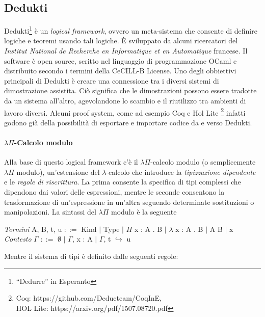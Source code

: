 \documentclass[12pt,a4paper]{mimosis}
\begin{document}
\subsection{Dedukti}
Dedukti\footnote{``Dedurre'' in Esperanto} è un \textit{logical framework}, ovvero
un meta-sistema che consente di definire logiche e teoremi usando tali logiche.
È sviluppato da alcuni ricercatori del \textit{Institut National de Recherche
en Informatique et en Automatique} francese. Il software è open source, scritto
nel linguaggio di programmazione OCaml e distribuito secondo i termini della
CeCILL-B License. Uno degli obbiettivi principali di Dedukti è creare
una connessione tra i diversi sistemi di dimostrazione assistita. Ciò significa
che le dimostrazioni possono essere tradotte da un sistema all'altro, agevolandone
lo scambio e il riutilizzo tra ambienti di lavoro diversi.
Alcuni proof system, come ad esempio Coq e Hol Lite \footnote{Coq: https://github.com/Deducteam/CoqInE,\\ HOL Lite: https://arxiv.org/pdf/1507.08720.pdf}
infatti godono già della possibilità di esportare e importare codice da e verso
Dedukti.

\paragraph{$\lambda\Pi$-Calcolo modulo}
Alla base di questo logical framework c'è il $\lambda\Pi$-calcolo modulo (o
semplicemente $\lambda\Pi$ modulo), un'estensione del $\lambda$-calcolo che introduce la \textit{tipizzazione dipendente} e le \textit{regole
di riscrittura}. La prima consente la specifica di tipi complessi che dipendono
dai valori delle espressioni, mentre le seconde consentono la trasformazione di
un'espressione in un'altra seguendo determinate sostituzioni o manipolazioni.
La sintassi del $\lambda\Pi$ modulo è la seguente
\begin{center}
  \textit{Termini } \hspace{1pt} A, B, t, u \hspace{1pt} $::=$ Kind $\vert$ Type $\vert$ $\Pi$ x : A . B $\vert$ $\lambda$ x : A . B $\vert$ A B $\vert$ x \\
  \textit{Contesto} \hspace{1pt} $\Gamma$ \hspace{1pt} $::=$ $\emptyset$ $\vert$ $\Gamma$, x : A $\vert$ $\Gamma$, t $\hookrightarrow$ u
\end{center}

Mentre il sistema di tipi è definito dalle seguenti regole:
\end{document}
